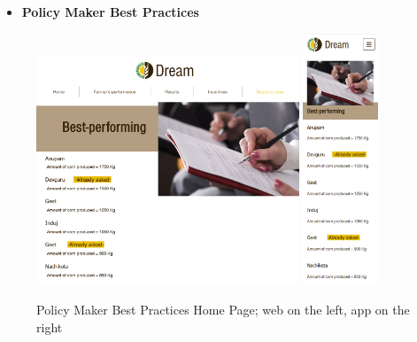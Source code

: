 \documentclass{article}
\begin{document}
    \begin{itemize}
        \item \textbf{Policy Maker Best Practices}
    \end{itemize}
        \begin{figure} [h]
            \centering
            \includegraphics[width=0.7\textwidth]{images/UserInterfaces/PolicyMaker/BestPractices/BestPracticesWeb.png}
            \quad
            \includegraphics[width=0.2\textwidth]{images/UserInterfaces/PolicyMaker/BestPractices/BestPracticesApp.png}
            \quad
            \caption{\label{fig:policyMakerBestPractices}Policy Maker Best Practices Home Page; web on the left, app on the right}
        \end{figure}
        \newpage
\end{document}
